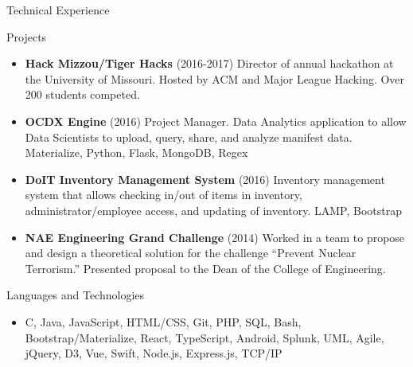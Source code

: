 \documentclass[]{mcdowellcv}
\begin{document}
    \begin{cvsection}{Technical Experience}
        \begin{cvsubsection}{Projects}{}{}
            \begin{itemize}
                \item \textbf{Hack Mizzou/Tiger Hacks} (2016-2017) Director of annual hackathon at the University of Missouri. Hosted by ACM and Major League Hacking. Over 200 students competed.
                \item \textbf{OCDX Engine} (2016) Project Manager. Data Analytics application to allow Data Scientists to upload, query, share, and analyze manifest data. Materialize, Python, Flask, MongoDB, Regex
                \item \textbf{DoIT Inventory Management System} (2016) Inventory management system that allows checking in/out of items in inventory, administrator/employee access, and updating of inventory. LAMP, Bootstrap
                \item \textbf{NAE Engineering Grand Challenge} (2014) Worked in a team to propose and design a theoretical solution for the challenge “Prevent Nuclear Terrorism.” Presented proposal to the Dean of the College of Engineering.
            \end{itemize}
        \end{cvsubsection}

        \begin{cvsubsection}{Languages and Technologies}{}{}
            \begin{itemize}
                \item C, Java, JavaScript, HTML/CSS, Git, PHP, SQL,  Bash, Bootstrap/Materialize, React, TypeScript, Android, Splunk, UML, Agile, jQuery, D3, Vue, Swift, Node.js, Express.js, TCP/IP
            \end{itemize}
        \end{cvsubsection}
    \end{cvsection}
    
\end{document}
